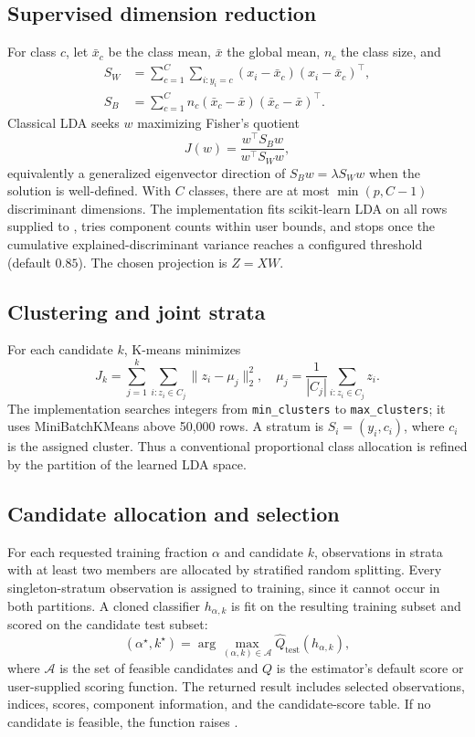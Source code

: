 \documentclass[conference]{IEEEtran}
\begin{document}
\subsection{Supervised dimension reduction}
For class \(c\), let \(\bar x_c\) be the class mean, \(\bar x\) the global mean, \(n_c\) the class size, and
\[
\begin{aligned}
S_W&=\sum_{c=1}^C\sum_{i:y_i=c}(x_i-\bar x_c)(x_i-\bar x_c)^\top,\\
S_B&=\sum_{c=1}^C n_c(\bar x_c-\bar x)(\bar x_c-\bar x)^\top.
\end{aligned}
\]
Classical LDA seeks \(w\) maximizing Fisher's quotient
\[
J(w)=\frac{w^\top S_Bw}{w^\top S_Ww},
\]
equivalently a generalized eigenvector direction of \(S_Bw=\lambda S_Ww\) when the solution is well-defined. With \(C\) classes, there are at most \(\min(p,C-1)\) discriminant dimensions. The implementation fits scikit-learn LDA on all rows supplied to , tries component counts within user bounds, and stops once the cumulative explained-discriminant variance reaches a configured threshold (default \(0.85\)). The chosen projection is \(Z=XW\).

\subsection{Clustering and joint strata}
For each candidate \(k\), K-means minimizes
\[
J_k=\sum_{j=1}^{k}\sum_{i:z_i\in C_j}\|z_i-\mu_j\|_2^2,
\quad
\mu_j=\frac{1}{|C_j|}\sum_{i:z_i\in C_j}z_i.
\]
The implementation searches integers from \texttt{min\_clusters} to \texttt{max\_clusters}; it uses MiniBatchKMeans above 50,000 rows. A stratum is \(S_i=(y_i,c_i)\), where \(c_i\) is the assigned cluster. Thus a conventional proportional class allocation is refined by the partition of the learned LDA space.

\subsection{Candidate allocation and selection}
For each requested training fraction \(\alpha\) and candidate \(k\), observations in strata with at least two members are allocated by stratified random splitting. Every singleton-stratum observation is assigned to training, since it cannot occur in both partitions. A cloned classifier \(h_{\alpha,k}\) is fit on the resulting training subset and scored on the candidate test subset:
\[
(\alpha^\star,k^\star)=\arg\max_{(\alpha,k)\in\mathcal{A}} 
\widehat{Q}_{\mathrm{test}}(h_{\alpha,k}),
\]
where \(\mathcal A\) is the set of feasible candidates and \(Q\) is the estimator's default score or user-supplied scoring function. The returned result includes selected observations, indices, scores, component information, and the candidate-score table. If no candidate is feasible, the function raises .
\end{document}
